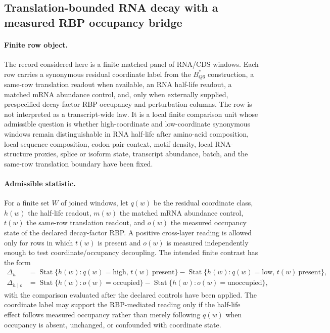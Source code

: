 \subsection{Translation-bounded RNA decay with a measured RBP occupancy bridge}
\label{sec:q6-translation-bounded-rna-decay-rbp-bridge-cross-layer}

\paragraph{Finite row object.}
The record considered here is a finite matched panel of RNA/CDS windows.  Each row carries a synonymous residual coordinate label from the $B^{*}_{Q6}$ construction, a same-row translation readout when available, an RNA half-life readout, a matched mRNA abundance control, and, only when externally supplied, prespecified decay-factor RBP occupancy and perturbation columns.  The row is not interpreted as a transcript-wide law.  It is a local finite comparison unit whose admissible question is whether high-coordinate and low-coordinate synonymous windows remain distinguishable in RNA half-life after amino-acid composition, local sequence composition, codon-pair context, motif density, local RNA-structure proxies, splice or isoform state, transcript abundance, batch, and the same-row translation boundary have been fixed.

\paragraph{Admissible statistic.}
For a finite set $W$ of joined windows, let $q(w)$ be the residual coordinate class, $h(w)$ the half-life readout, $m(w)$ the matched mRNA abundance control, $t(w)$ the same-row translation readout, and $o(w)$ the measured occupancy state of the declared decay-factor RBP.  A positive cross-layer reading is allowed only for rows in which $t(w)$ is present and $o(w)$ is measured independently enough to test coordinate/occupancy decoupling.  The intended finite contrast has the form
$$
\begin{aligned}
\Delta_{h} &= \operatorname{Stat}\{h(w):q(w)=\mathrm{high},\,t(w)\ \mathrm{present}\}
           - \operatorname{Stat}\{h(w):q(w)=\mathrm{low},\,t(w)\ \mathrm{present}\},\\
\Delta_{h\mid o} &= \operatorname{Stat}\{h(w):o(w)=\mathrm{occupied}\}
           - \operatorname{Stat}\{h(w):o(w)=\mathrm{unoccupied}\},
\end{aligned}
$$
with the comparison evaluated after the declared controls have been applied.  The coordinate label may support the RBP-mediated reading only if the half-life effect follows measured occupancy rather than merely following $q(w)$ when occupancy is absent, unchanged, or confounded with coordinate state.

